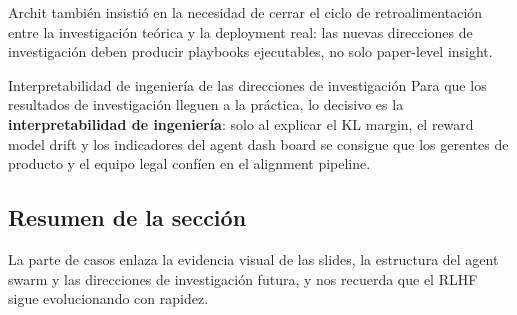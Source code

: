 Archit también insistió en la necesidad de cerrar el ciclo de retroalimentación entre la investigación teórica y la deployment real: las nuevas direcciones de investigación deben producir playbooks ejecutables, no solo paper-level insight.

\begin{knowledgebox}{Interpretabilidad de ingeniería de las direcciones de investigación}
Para que los resultados de investigación lleguen a la práctica, lo decisivo es la \textbf{interpretabilidad de ingeniería}: solo al explicar el KL margin, el reward model drift y los indicadores del agent dash board se consigue que los gerentes de producto y el equipo legal confíen en el alignment pipeline.
\end{knowledgebox}

\subsection{Resumen de la sección}

La parte de casos enlaza la evidencia visual de las slides, la estructura del agent swarm y las direcciones de investigación futura, y nos recuerda que el RLHF sigue evolucionando con rapidez.
